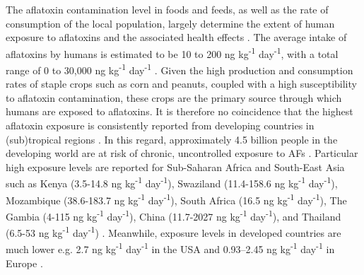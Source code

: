 The aflatoxin contamination level in foods and feeds, as well as the rate of consumption of the local population, largely determine the extent of human exposure to aflatoxins and the associated health effects \citep{jallow2021worldwide}. The average intake of aflatoxins by humans is estimated to be 10 to 200 ng kg\textsuperscript{-1} day\textsuperscript{-1}, with a total range of 0 to 30,000 ng kg\textsuperscript{-1} day\textsuperscript{-1} \citep{kaplan2003clinical, gong2016aflatoxin}. Given the high production and consumption rates of staple crops such as corn and peanuts, coupled with a high susceptibility to aflatoxin contamination, these crops are the primary source through which humans are exposed to aflatoxins. It is therefore no coincidence that the highest aflatoxin exposure is consistently reported from developing countries in (sub)tropical regions \citep{jallow2021worldwide}. In this regard, approximately 4.5 billion people in the developing world are at risk of chronic, uncontrolled exposure to AFs \citep{williams2004human, rushing2019aflatoxin, shephard2003aflatoxin, williams2004human}. Particular high exposure levels are reported for Sub-Saharan Africa and South-East Asia \citep{gong2016aflatoxin} such as Kenya (3.5-14.8 ng kg\textsuperscript{-1} day\textsuperscript{-1}), Swaziland (11.4-158.6 ng kg\textsuperscript{-1} day\textsuperscript{-1}), Mozambique (38.6-183.7 ng kg\textsuperscript{-1} day\textsuperscript{-1}), South Africa (16.5 ng kg\textsuperscript{-1} day\textsuperscript{-1}), The Gambia (4-115 ng kg\textsuperscript{-1} day\textsuperscript{-1}), China (11.7-2027 ng kg\textsuperscript{-1} day\textsuperscript{-1}), and Thailand (6.5-53 ng kg\textsuperscript{-1} day\textsuperscript{-1}) \citep{williams2004human}. Meanwhile, exposure levels in developed countries are much lower e.g. 2.7 ng kg\textsuperscript{-1} day\textsuperscript{-1} in the USA \citep{williams2004human} and 0.93–2.45 ng kg\textsuperscript{-1} day\textsuperscript{-1} in Europe \citep{jecfa2008sixty}.



